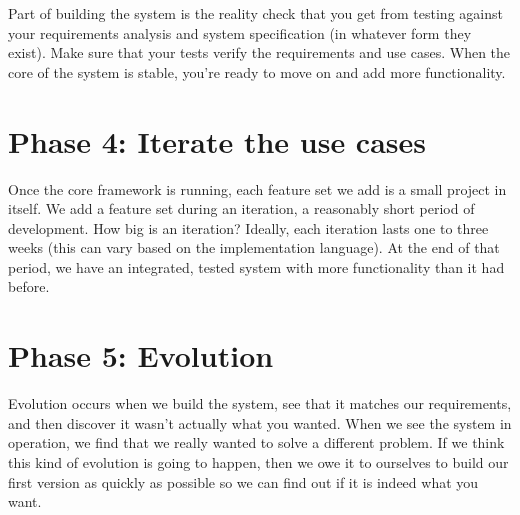 \documentclass[10pt,a4paper]{article}
\begin{document}
Part of building the system is the reality check that you get from
testing against your requirements analysis and system specification
(in whatever form they exist). Make sure that your tests verify the
requirements and use cases. When the core of the system is stable,
you’re ready to move on and add more functionality.
\section{Phase 4: Iterate the use cases}
Once the core framework is running, each feature set we add is a
small project in itself. We add a feature set during an iteration, a
reasonably short period of development.
How big is an iteration? Ideally, each iteration lasts one to three
weeks (this can vary based on the implementation language). At
the end of that period, we have an integrated, tested system with
more functionality than it had before.
\section{Phase 5: Evolution}
Evolution occurs when we build the system, see that it matches
our requirements, and then discover it wasn’t actually what you
wanted. When we see the system in operation, we find that we
really wanted to solve a different problem. If we think this kind of
evolution is going to happen, then we owe it to ourselves to build
our first version as quickly as possible so we can find out if it is
indeed what you want.
\end{document}
